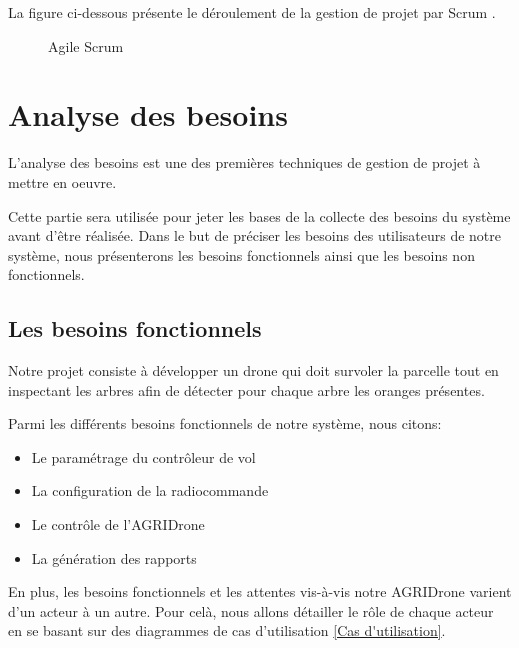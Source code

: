 La figure ci-dessous présente le déroulement de la gestion de projet par Scrum \cite{Crochet}.

\begin{figure} [H]
	\begin{center}
		\centering
		\hspace*{-0.5cm}
	\end{center}
	\caption{Agile Scrum}
\end{figure}
\section{Analyse des besoins }	
L'analyse des besoins est une des premières techniques de gestion de projet à mettre en oeuvre.

Cette partie sera utilisée pour jeter les bases de la collecte des besoins du système avant d'être réalisée.
Dans le but de préciser les besoins des utilisateurs de notre système, nous présenterons les besoins fonctionnels ainsi que les besoins non fonctionnels.

\subsection{Les besoins fonctionnels}
Notre projet consiste à développer un drone qui doit survoler la parcelle tout en inspectant les arbres afin de détecter pour chaque arbre les oranges présentes.

Parmi les différents besoins fonctionnels de notre système, nous citons:
\begin{itemize}
	\item Le paramétrage du contrôleur de vol 
	\item  La configuration de la radiocommande 
	\item Le contrôle de l'AGRIDrone
	\item La génération des rapports
\end{itemize} 

En plus, les besoins fonctionnels et les attentes vis-à-vis notre AGRIDrone varient d'un acteur à un autre. Pour celà, nous allons détailler le rôle de chaque acteur en se basant sur des diagrammes de cas d'utilisation \ref{Cas d'utilisation}.

